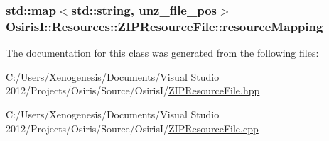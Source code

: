 \hypertarget{class_osiris_i_1_1_resources_1_1_z_i_p_resource_file_aac135bd9c1c42a52811f379d4f5aaae6}{
\subsubsection[{resource\-Mapping}]{\setlength{\rightskip}{0pt plus 5cm}std\-::map$<$std\-::string, unz\-\_\-file\-\_\-pos$>$ Osiris\-I\-::\-Resources\-::\-Z\-I\-P\-Resource\-File\-::resource\-Mapping\hspace{0.3cm}{\ttfamily [protected]}}}\label{class_osiris_i_1_1_resources_1_1_z_i_p_resource_file_aac135bd9c1c42a52811f379d4f5aaae6}


The documentation for this class was generated from the following files\-:\begin{DoxyCompactItemize}
\item 
C\-:/\-Users/\-Xenogenesis/\-Documents/\-Visual Studio 2012/\-Projects/\-Osiris/\-Source/\-Osiris\-I/\hyperlink{_z_i_p_resource_file_8hpp}{Z\-I\-P\-Resource\-File.\-hpp}\item 
C\-:/\-Users/\-Xenogenesis/\-Documents/\-Visual Studio 2012/\-Projects/\-Osiris/\-Source/\-Osiris\-I/\hyperlink{_z_i_p_resource_file_8cpp}{Z\-I\-P\-Resource\-File.\-cpp}\end{DoxyCompactItemize}
